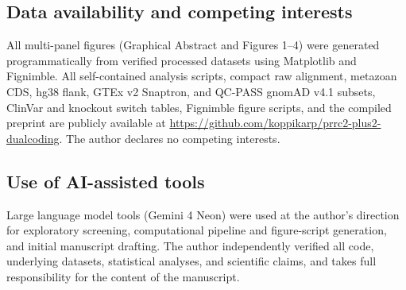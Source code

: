 \documentclass[10pt,letterpaper]{article}
\begin{document}
\subsection{Data availability and competing interests}

All multi-panel figures (Graphical Abstract and Figures 1--4) were generated programmatically from verified processed datasets using Matplotlib and Fignimble. All self-contained analysis scripts, compact raw alignment, metazoan CDS, hg38 flank, GTEx v2 Snaptron, and QC-PASS gnomAD v4.1 subsets, ClinVar and knockout switch tables, Fignimble figure scripts, and the compiled preprint are publicly available at \url{https://github.com/koppikarp/prrc2-plus2-dualcoding}. The author declares no competing interests.

\subsection{Use of AI-assisted tools}

Large language model tools (Gemini 4 Neon) were used at the author's direction for exploratory screening, computational pipeline and figure-script generation, and initial manuscript drafting. The author independently verified all code, underlying datasets, statistical analyses, and scientific claims, and takes full responsibility for the content of the manuscript.

\vspace{4pt}
\end{document}
